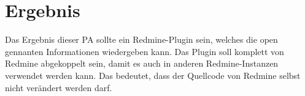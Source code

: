 \section{Ergebnis}

Das Ergebnis dieser PA sollte ein Redmine-Plugin sein, welches die open gennanten Informationen wiedergeben kann. \newline
Das Plugin soll komplett von Redmine abgekoppelt sein, damit es auch in anderen Redmine-Instanzen verwendet werden kann.
Das bedeutet, dass der Quellcode von Redmine selbst nicht verändert werden darf. \newline
